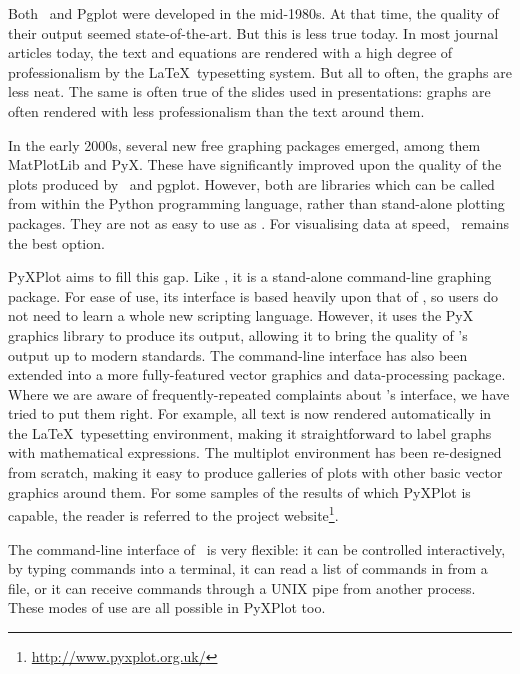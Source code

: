 Both \gnuplot\ and Pgplot were developed in the mid-1980s. At that time, the
quality of their output seemed state-of-the-art. But this is less true today.
In most journal articles today, the text and equations are rendered with a high
degree of professionalism by the \LaTeX\ typesetting system. But all to often,
the graphs are less neat.  The same is often true of the slides used in
presentations: graphs are often rendered with less professionalism than the
text around them.

In the early 2000s, several new free graphing packages emerged, among them {\sc
MatPlotLib} and {\sc PyX}.  These have
significantly improved upon the quality of the plots produced by \gnuplot\ and
pgplot. However, both are libraries which can be called from within the Python
programming language, rather than stand-alone plotting packages. They are not
as easy to use as \gnuplot.  For visualising data at speed, \gnuplot\ remains the
best option.

{\sc PyXPlot} aims to fill this gap. Like \gnuplot, it is a stand-alone
command-line graphing package. For ease of use, its interface is based heavily
upon that of \gnuplot, so users do not need to learn a whole new scripting
language. However, it uses the PyX graphics library to produce its output,
allowing it to bring the quality of \gnuplot's output up to modern standards.
The command-line interface has also been extended into a more fully-featured
vector graphics and data-processing package.  Where we are aware of
frequently-repeated complaints about \gnuplot's interface, we have tried to put
them right.  For example, all text is now rendered automatically in the \LaTeX\
typesetting environment, making it straightforward to label graphs with
mathematical expressions. The multiplot environment has been re-designed from
scratch, making it easy to produce galleries of plots with other basic vector
graphics around them.  For some samples of the results of which PyXPlot is
capable, the reader is referred to the project
website\footnote{\url{http://www.pyxplot.org.uk/}}.

The command-line interface of \gnuplot\ is very flexible: it can be controlled
interactively, by typing commands into a terminal, it can read a list of
commands in from a file, or it can receive commands through a UNIX pipe from
another process. These modes of use are all possible in PyXPlot too.

